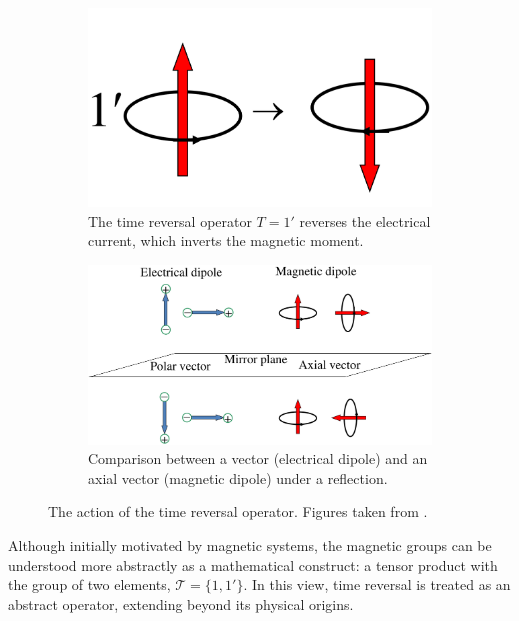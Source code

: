 \documentclass[12pt]{report}
\begin{document}
\begin{figure}[H]
\centering
\begin{subfigure}{.4\textwidth}
  \centering
  \includegraphics[height=0.6\linewidth]{fig/timerev.png}
  \caption{The time reversal operator $T = 1'$ reverses the electrical current, which inverts the magnetic moment.}
  \label{fig:timerev_a}
\end{subfigure} \hfill
\begin{subfigure}{.55\textwidth}
  \centering
  \includegraphics[width=\linewidth]{fig/axialvec.png}
  \caption{Comparison between a vector (electrical dipole) and an axial vector (magnetic dipole) under a reflection.}
  \label{fig:axialvec_b}
\end{subfigure}
\caption{The action of the time reversal operator. Figures taken from \cite{magnetic_structures2012}.}
\label{fig:timerev_axialvec}
\end{figure}

Although initially motivated by magnetic systems, the magnetic groups can be understood more abstractly as a mathematical construct: a tensor product with the group of two elements, \(\mathcal{T} = \{1, 1'\}\). In this view, time reversal is treated as an abstract operator, extending beyond its physical origins.
\end{document}

